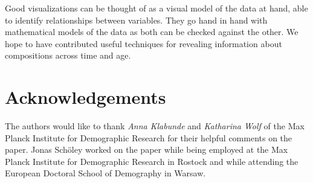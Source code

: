 \documentclass{scrartcl}
\begin{document}
Good visualizations can be thought of as a visual model of the data at hand, able to identify relationships between variables. They go hand in hand with mathematical models of the data as both can be checked against the other. We hope to have contributed useful techniques for revealing information about compositions across time and age.

\clearpage

\section{Acknowledgements} %
\label{sec:ack}

The authors would like to thank \emph{Anna Klabunde} and \emph{Katharina Wolf} of the Max Planck Institute for Demographic Research for their helpful comments on the paper. Jonas Schöley worked on the paper while being employed at the Max Planck Institute for Demographic Research in Rostock and while attending the European Doctoral School of Demography in Warsaw.

\clearpage


\sloppy
\printbibliography

\clearpage


\renewcommand\thefigure{\thesection.\arabic{figure}}
\setcounter{figure}{0}
\end{document}
